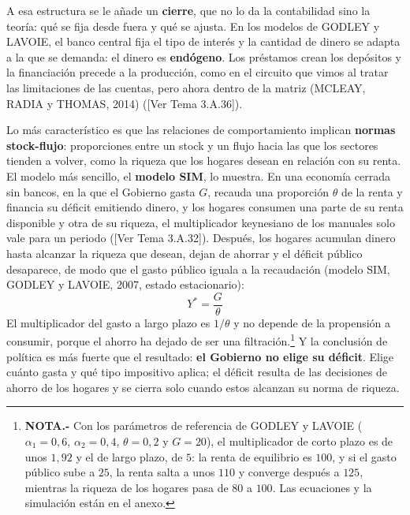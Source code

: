 \documentclass[10pt,a4paper]{article}
\newcommand{\authorfont}[1]{{\fontfamily{EBGaramond-TLF}\selectfont #1}}
\newcounter{anexo}
\begin{document}
A esa estructura se le añade un \textbf{cierre}, que no lo da la contabilidad sino la teoría: qué se fija desde fuera y qué se ajusta. En los modelos de GODLEY y LAVOIE, el banco central fija el tipo de interés y la cantidad de dinero se adapta a la que se demanda: el dinero es \textbf{endógeno}. Los préstamos crean los depósitos y la financiación precede a la producción, como en el circuito que vimos al tratar las limitaciones de las cuentas, pero ahora dentro de la matriz (MCLEAY, RADIA y THOMAS, 2014) ([\authorfont{Ver Tema 3.A.36}]).

Lo más característico es que las relaciones de comportamiento implican \textbf{normas stock-flujo}: proporciones entre un stock y un flujo hacia las que los sectores tienden a volver, como la riqueza que los hogares desean en relación con su renta. El modelo más sencillo, el \textbf{modelo SIM}, lo muestra. En una economía cerrada sin bancos, en la que el Gobierno gasta $G$, recauda una proporción $\theta$ de la renta y financia su déficit emitiendo dinero, y los hogares consumen una parte de su renta disponible y otra de su riqueza, el multiplicador keynesiano de los manuales solo vale para un periodo ([\authorfont{Ver Tema 3.A.32}]). Después, los hogares acumulan dinero hasta alcanzar la riqueza que desean, dejan de ahorrar y el déficit público desaparece, de modo que el gasto público iguala a la recaudación (modelo SIM, GODLEY y LAVOIE, 2007, estado estacionario):
$$Y^{*}=\frac{G}{\theta}$$
El multiplicador del gasto a largo plazo es $1/\theta$ y no depende de la propensión a consumir, porque el ahorro ha dejado de ser una filtración.\footnote{%
    \textbf{NOTA.-} Con los parámetros de referencia de GODLEY y LAVOIE ($\alpha_1=0{,}6$, $\alpha_2=0{,}4$, $\theta=0{,}2$ y $G=20$), el multiplicador de corto plazo es de unos $1{,}92$ y el de largo plazo, de $5$: la renta de equilibrio es $100$, y si el gasto público sube a $25$, la renta salta a unos $110$ y converge después a $125$, mientras la riqueza de los hogares pasa de $80$ a $100$. Las ecuaciones y la simulación están en el anexo.
} Y la conclusión de política es más fuerte que el resultado: \textbf{el Gobierno no elige su déficit}. Elige cuánto gasta y qué tipo impositivo aplica; el déficit resulta de las decisiones de ahorro de los hogares y se cierra solo cuando estos alcanzan su norma de riqueza.
\end{document}
